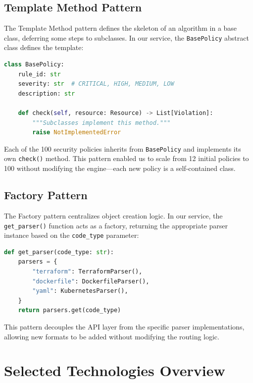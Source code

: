 \subsection{Template Method Pattern}

The Template Method pattern defines the skeleton of an algorithm in a base class, deferring some steps to subclasses. In our service, the \texttt{BasePolicy} abstract class defines the template:

\begin{lstlisting}[language=Python, caption={BasePolicy template method}, label={lst:basepolicy}]
class BasePolicy:
    rule_id: str
    severity: str  # CRITICAL, HIGH, MEDIUM, LOW
    description: str

    def check(self, resource: Resource) -> List[Violation]:
        """Subclasses implement this method."""
        raise NotImplementedError
\end{lstlisting}

Each of the 100 security policies inherits from \texttt{BasePolicy} and implements its own \texttt{check()} method. This pattern enabled us to scale from 12 initial policies to 100 without modifying the engine—each new policy is a self-contained class.

\subsection{Factory Pattern}

The Factory pattern centralizes object creation logic. In our service, the \texttt{get\_parser()} function acts as a factory, returning the appropriate parser instance based on the \texttt{code\_type} parameter:

\begin{lstlisting}[language=Python, caption={Parser factory function}, label={lst:factory}]
def get_parser(code_type: str):
    parsers = {
        "terraform": TerraformParser(),
        "dockerfile": DockerfileParser(),
        "yaml": KubernetesParser(),
    }
    return parsers.get(code_type)
\end{lstlisting}

This pattern decouples the API layer from the specific parser implementations, allowing new formats to be added without modifying the routing logic.

\section{Selected Technologies Overview}


